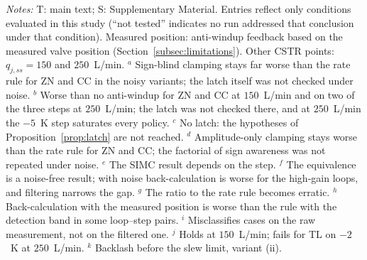 \begin{table}[t]
\vspace{2pt}
\parbox{\textwidth}{\scriptsize \emph{Notes:} T: main text; S: Supplementary Material. Entries reflect only conditions evaluated in this study (``not tested'' indicates no run addressed that conclusion under that condition). Measured position: anti-windup feedback based on the measured valve position (Section~\ref{subsec:limitations}). Other CSTR points: $q_{j,ss} = 150$ and $250$~L/min. $^a$ Sign-blind clamping stays far worse than the rate rule for ZN and CC in the noisy variants; the latch itself was not checked under noise. $^b$ Worse than no anti-windup for ZN and CC at $150$~L/min and on two of the three steps at $250$~L/min; the latch was not checked there, and at $250$~L/min the $-5$~K step saturates every policy. $^c$ No latch: the hypotheses of Proposition~\ref{prop:latch} are not reached. $^d$ Amplitude-only clamping stays worse than the rate rule for ZN and CC; the factorial of sign awareness was not repeated under noise. $^e$ The SIMC result depends on the step. $^f$ The equivalence is a noise-free result; with noise back-calculation is worse for the high-gain loops, and filtering narrows the gap. $^g$ The ratio to the rate rule becomes erratic. $^h$ Back-calculation with the measured position is worse than the rule with the detection band in some loop--step pairs. $^i$ Misclassifies cases on the raw measurement, not on the filtered one. $^j$ Holds at $150$~L/min; fails for TL on $-2$~K at $250$~L/min. $^k$ Backlash before the slew limit, variant (ii).}
\end{table}
